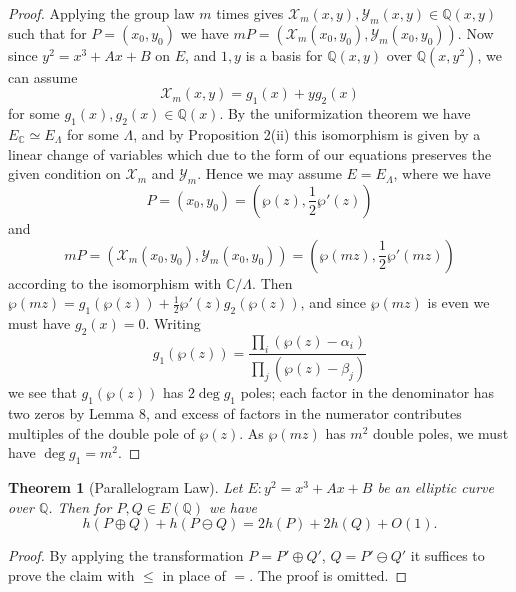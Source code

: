 \documentclass[a4paper]{article}
\theoremstyle{plain}
\newtheorem{theorem}{Theorem}
\theoremstyle{remark}
\theoremstyle{definition}
\newcommand{\X}{\mathcal{X}}
\newcommand{\Y}{\mathcal{Y}}
\newcommand{\Q}{\mathbb{Q}}
\newcommand{\C}{\mathbb{C}}
\begin{document}
\begin{proof}
    Applying the group law $m$ times gives $\X_m(x,y),\Y_m(x,y)\in\Q(x,y)$ such
    that for $P=(x_0,y_0)$ we have $mP=(\X_m(x_0,y_0),\Y_m(x_0,y_0))$. Now since
    $y^2=x^3+Ax+B$ on $E$, and $1,y$ is a basis for $\Q(x,y)$ over $\Q(x,y^2)$,
    we can assume
    \begin{equation*}
        \X_m(x,y) = g_1(x) + yg_2(x)
    \end{equation*}
    for some $g_1(x),g_2(x)\in\Q(x)$. By the uniformization theorem we have
    $E_\C\simeq E_\Lambda$ for some $\Lambda$, and by Proposition 2(ii) this
    isomorphism is given by a linear change of variables which due to the form
    of our equations preserves the given condition on $\X_m$ and $\Y_m$. Hence
    we may assume $E=E_\Lambda$, where we have
    \begin{equation*}
        P = (x_0,y_0) = (\wp(z),\frac{1}{2}\wp'(z))
    \end{equation*}
    and
    \begin{equation*}
        mP = (\X_m(x_0,y_0),\Y_m(x_0,y_0)) = (\wp(mz),\frac{1}{2}\wp'(mz))
    \end{equation*}
    according to the isomorphism with $\C/\Lambda$. Then
    $\wp(mz)=g_1(\wp(z))+\frac{1}{2}\wp'(z)g_2(\wp(z))$, and since
    $\wp(mz)$ is even we must have $g_2(x)=0$. Writing
    \begin{equation*}
        g_1(\wp(z)) = \frac{\prod_i(\wp(z)-\alpha_i)}{\prod_j(\wp(z)-\beta_j)}
    \end{equation*}
    we see that $g_1(\wp(z))$ has $2\deg g_1$ poles; each factor in the
    denominator has two zeros by Lemma 8, and excess of factors in the numerator
    contributes multiples of the double pole of $\wp(z)$. As $\wp(mz)$ has $m^2$
    double poles, we must have $\deg g_1=m^2$.
\end{proof}

\begin{theorem}[Parallelogram Law]
    Let $E:y^2=x^3+Ax+B$ be an elliptic curve over $\Q$. Then for $P,Q\in E(\Q)$
    we have
    \begin{equation*}
        h(P\oplus Q) + h(P\ominus Q) = 2h(P) + 2h(Q) + O(1).
    \end{equation*}
\end{theorem}

\begin{proof}
    By applying the transformation $P=P'\oplus Q'$, $Q=P'\ominus Q'$ it suffices
    to prove the claim with $\le$ in place of $=$. The proof is omitted.
\end{proof}
\end{document}
